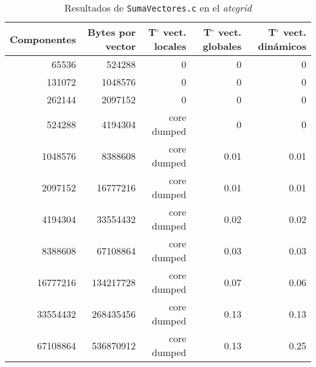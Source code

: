 \begin{center}
\begin{table}[!h]
\begin{tabular}{r r r r r}
\textbf{Componentes} & \textbf{Bytes por vector} & \textbf{T$^\circ$ vect. locales} & \textbf{T$^\circ$ vect. globales} & \textbf{T$^\circ$ vect. dinámicos} \\
\toprule
65536                & 524288                    & 0                         & 0                          & 0                           \\
131072               & 1048576                   & 0                         & 0                          & 0                           \\
262144               & 2097152                   & 0                         & 0                          & 0                           \\
524288               & 4194304                   & core dumped               & 0                          & 0                           \\
1048576              & 8388608                   & core dumped               & 0.01                       & 0.01                        \\
2097152              & 16777216                  & core dumped               & 0.01                       & 0.01                        \\
4194304              & 33554432                  & core dumped               & 0.02                       & 0.02                        \\
8388608              & 67108864                  & core dumped               & 0.03                       & 0.03                        \\
16777216             & 134217728                 & core dumped               & 0.07                       & 0.06                        \\
33554432             & 268435456                 & core dumped               & 0.13                       & 0.13                        \\
67108864             & 536870912                 & core dumped               & 0.13                       & 0.25                        \\
\end{tabular}
\caption{Resultados de \texttt{SumaVectores.c} en el \textit{atcgrid}}
\end{table}
\end{center}

\section{}\label{ej1-8}

